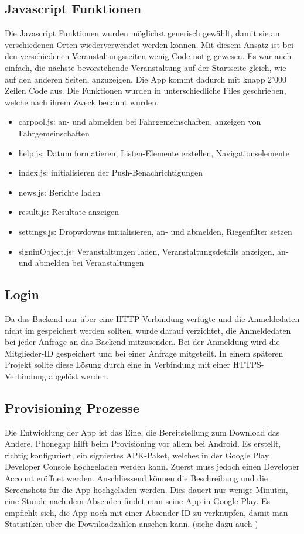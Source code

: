 \newpage
\FloatBarrier
\subsection{Javascript Funktionen}
Die Javascript Funktionen wurden möglichst generisch gewählt, damit sie an verschiedenen Orten wiederverwendet werden können. Mit diesem Ansatz ist bei den verschiedenen Veranstaltungsseiten wenig Code nötig gewesen. Es war auch einfach, die nächste bevorstehende Veranstaltung auf der Startseite gleich, wie auf den anderen Seiten, anzuzeigen. Die App kommt dadurch mit knapp 2'000 Zeilen Code aus. Die Funktionen wurden in unterschiedliche Files geschrieben, welche nach ihrem Zweck benannt wurden.
\begin{itemize}
\item carpool.js: an- und abmelden bei Fahrgemeinschaften, anzeigen von Fahrgemeinschaften
\item help.js:  Datum formatieren,  Listen-Elemente erstellen, Navigationselemente
\item index.js: initialisieren der Push-Benachrichtigungen
\item news.js: Berichte laden
\item result.js: Resultate anzeigen
\item settings.js: Dropwdowns initialisieren, an- und abmelden, Riegenfilter setzen
\item signinObject.js: Veranstaltungen laden, Veranstaltungsdetails anzeigen, an- und abmelden bei Veranstaltungen 
\end{itemize}

\subsection{Login}
Da das Backend nur über eine HTTP-Verbindung verfügte und die Anmeldedaten nicht im   gespeichert werden sollten, wurde darauf verzichtet, die Anmeldedaten bei jeder Anfrage an das Backend mitzusenden. Bei der Anmeldung wird die Mitglieder-ID gespeichert und bei einer Anfrage mitgeteilt. In einem späteren Projekt sollte diese Lösung durch eine  in Verbindung mit einer HTTPS-Verbindung abgelöst werden.

\subsection{Provisioning Prozesse}
Die Entwicklung der App ist das Eine, die Bereitstellung zum Download das Andere. Phonegap hilft beim Provisioning vor allem bei Android. Es erstellt, richtig konfiguriert, ein signiertes APK-Paket, welches in der Google Play Developer Console hochgeladen werden kann. Zuerst muss jedoch einen Developer Account eröffnet werden. Anschliessend können die Beschreibung und die Screenshots für die App hochgeladen werden. Dies dauert nur wenige Minuten, eine Stunde nach dem Absenden findet man seine App in Google Play. Es empfiehlt sich, die App noch mit einer Absender-ID zu verknüpfen, damit man Statistiken über die Downloadzahlen ansehen kann. (siehe dazu auch \cite{android_prov})

